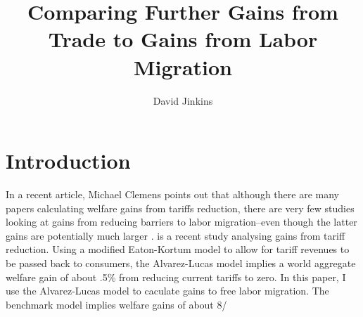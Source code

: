 \documentclass{article}
\title{Comparing Further Gains from Trade to Gains from Labor Migration}
\author{David Jinkins}
\begin{document}
\maketitle

\section{Introduction}
In a recent article, Michael Clemens points out that although there are many papers calculating welfare gains from tariffs reduction, there are very few studies looking at gains from reducing barriers to labor migration--even though the latter gains are potentially much larger \citep{Clemens2011} . \citet{AlvarezLucas2007} is a recent study analysing gains from tariff reduction.  Using a modified Eaton-Kortum model to allow for tariff revenues to be passed back to consumers, the Alvarez-Lucas model implies a world aggregate welfare gain of about .5\% from reducing current tariffs to zero.  In this paper, I use the Alvarez-Lucas model to caculate gains to free labor migration.  The benchmark model implies welfare gains of about 8/%




\end{document}
